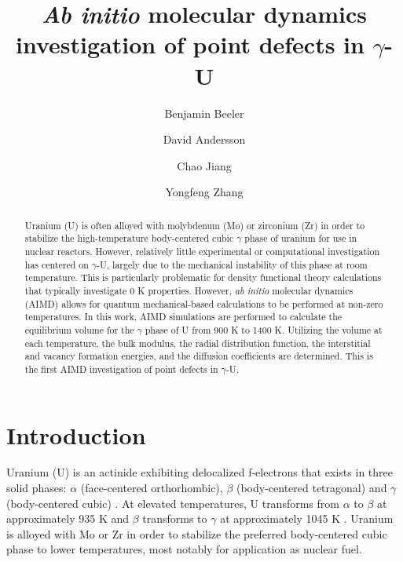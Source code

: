 \documentclass[review]{elsarticle}
\begin{document}
\begin{frontmatter}
\title{\textit{Ab initio} molecular dynamics investigation of point defects in $\gamma$-U}

\author[ncsu,inl]{Benjamin Beeler}
\author[lanl]{David Andersson}
\author[inl]{Chao Jiang}
\author[wisc,inl]{Yongfeng Zhang}
\address[ncsu]{North Carolina State University, Raleigh, NC 27607}
\address[inl]{Idaho National Laboratory, Idaho Falls, ID 83415}
\address[lanl]{Los Alamos National Laboratory, Los Alamos, NM 87545}
\address[wisc]{University of Wisconsin-Madison, Madison, WI 53706}

\begin{abstract}

Uranium (U) is often alloyed with molybdenum (Mo) or zirconium (Zr) in order to stabilize the high-temperature body-centered cubic $\gamma$ phase of uranium for use in nuclear reactors. However, relatively little experimental or computational investigation has centered on $\gamma$-U, largely due to the mechanical instability of this phase at room temperature. This is particularly problematic for density functional theory calculations that typically investigate 0 K properties. However, \textit{ab initio} molecular dynamics (AIMD) allows for quantum mechanical-based calculations to be performed at non-zero temperatures. In this work, AIMD simulations are performed to calculate the equilibrium volume for the $\gamma$ phase of U from 900 K to 1400 K. Utilizing the volume at each temperature, the bulk modulus, the radial distribution function, the interstitial and vacancy formation energies, and the diffusion coefficients are determined. This is the first AIMD investigation of point defects in $\gamma$-U. 

\end{abstract}
\end{frontmatter}

\section{Introduction}

Uranium (U) is an actinide exhibiting delocalized f-electrons that exists in three solid phases: $\alpha$ (face-centered orthorhombic), $\beta$ (body-centered tetragonal) and $\gamma$ (body-centered cubic) \cite{yoo1998}. At elevated temperatures, U transforms from $\alpha$ to $\beta$ at approximately 935 K and $\beta$ transforms to $\gamma$ at approximately 1045 K \cite{soderlind1998}. Uranium is alloyed with Mo or Zr in order to stabilize the preferred body-centered cubic phase to lower temperatures, most notably for application as nuclear fuel. 
\end{document}
